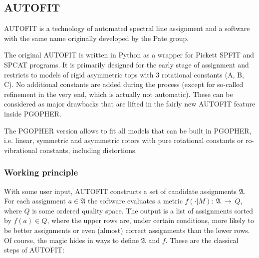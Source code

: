 \documentclass[11pt]{article}
\begin{document}
\subsection{AUTOFIT}

AUTOFIT is a technology of automated spectral line assignment and a software with the same name originally developed by the Pate group. 

The original AUTOFIT is written in Python as a wrapper for Pickett SPFIT and SPCAT programs. It is primarily designed for the early stage of assignment and restricts to models of rigid asymmetric tops with 3 rotational constants (A, B, C).  No additional constants are added during the process (except for so-called refinement in the very end, which is actually not automatic). These can be considered as major drawbacks that are lifted in the fairly new AUTOFIT feature inside PGOPHER. 

The PGOPHER version allows to fit all models that can be built in PGOPHER, i.e. linear, symmetric and asymmetric rotors with pure rotational constants  or ro-vibrational constants, including distortions.

\subsubsection{Working principle}

With some user input, AUTOFIT constructs a set of candidate assignments $\mathfrak{A}$. For each assignment $a \in \mathfrak{A}$ the software evaluates a metric $f(\cdot | M):~\mathfrak{A}~\rightarrow~Q$, where $Q$ is some ordered quality space. The output is a list of assignments sorted by $f(a) \in Q$, where the upper rows are, under certain conditions, more likely to be better assignments or even (almost) correct assignments than the lower rows. Of course, the magic hides in ways to define $\mathfrak{A}$ and $f$. These are the classical steps of AUTOFIT:
\end{document}
